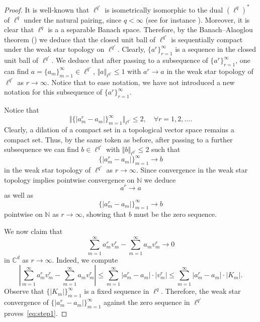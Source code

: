 \documentclass{article}
\theoremstyle{definition}
\theoremstyle{remark}
\numberwithin{equation}{section}
\newcommand{\complex}{\mathbb{C}}
\newcommand{\1}{\mathbf{1}}
\begin{document}
\begin{proof}
        It is well-known that $\ell^{q'}$ is isometrically isomorphic to the dual $(\ell^{q})^{*}$ of $\ell^{q}$ under the natural pairing, since $q<\infty$ (see for instance \cite[Chapter III, Examples 5.9 and 5.10]{Conway2007}). Moreover, it is clear that $\ell^{q}$ is a a separable Banach space. Therefore, by the Banach--Alaoglou theorem (\cite[Chapter V, Theorems 3.1 and 5.1]{Conway2007}) we deduce that the closed unit ball of $\ell^{q'}$ is sequentially compact under the weak star topology on $\ell^{q'}$. Clearly, $\{a^{r}\}_{r=1}^{\infty}$ is a sequence in the closed unit ball of $\ell^{q'}$. We deduce that after passing to a subsequence of $\{a^r\}^{\infty}_{r=1}$, one can find $a=\{a_m\}_{m=1}^{\infty}\in\ell^{q'}$, $\Vert a\Vert_{\ell^{q'}}\leq1$ with $a^{r}\to a$ in the weak star topology of $\ell^{q'}$ as $r\to\infty$. Notice that to ease notation, we have not introduced a new notation for this subsequence of $\{a^{r}\}_{r=1}^{\infty}$.

        Notice that
        \begin{equation*}
            \Vert \{|a^{r}_m-a_{m}|\}_{m=1}^{\infty}\Vert_{\ell^{q'}} \leq 2,\quad\forall r=1,2,\ldots.
        \end{equation*}
        Clearly, a dilation of a compact set in a topological vector space remains a compact set. Thus, by the same token as before, after passing to a further subsequence we can find $b\in\ell^{q'}$ with $\Vert b\Vert_{\ell^{q'}}\leq2$ such that
        \begin{equation*}
            \{|a^{r}_m-a_{m}|\}_{m=1}^{\infty}\to b
        \end{equation*}
        in the weak star topology of $\ell^{q'}$ as $r\to\infty$. Since convergence in the weak star topology implies pointwise convergence on $\mathbb{N}$ we deduce
        \begin{equation*}
            a^{r}\to a
        \end{equation*}
        as well as
        \begin{equation*}
            \{|a^{r}_m-a_{m}|\}_{m=1}^{\infty}\to b
        \end{equation*}
        pointwise on $\mathbb{N}$ as $r\to\infty$, showing that $b$ must be the zero sequence.
        
        We now claim that
        \begin{equation}
            \label{eq:step1}
            \sum_{m=1}^{\infty}a^{r}_{m}v_{m}^{r} - \sum_{m=1}^{\infty}a_{m}v_{m}^{r}\to 0
        \end{equation}
        in $\complex^d$ as $r\to\infty$. Indeed, we compute
        \begin{equation*}
            \left|\sum_{m=1}^{\infty}a^{r}_{m}v_{m}^{r} - \sum_{m=1}^{\infty}a_{m}v_{m}^{r}\right|
            \leq\sum_{m=1}^{\infty}|a^{r}_{m}-a_{m}|\cdot|v_{m}^{r}|
            \leq\sum_{m=1}^{\infty}|a^{r}_{m}-a_{m}|\cdot|K_{m}|.
        \end{equation*}
        Observe that $\{|K_{m}|\}_{m=1}^{\infty}$ is a fixed sequence in $\ell^{q}$. Therefore, the weak star convergence of $\{|a^{r}_m-a_{m}|\}_{m=1}^{\infty}$ against the zero sequence in $\ell^{q'}$ proves~\eqref{eq:step1}.


\end{proof}
\end{document}
